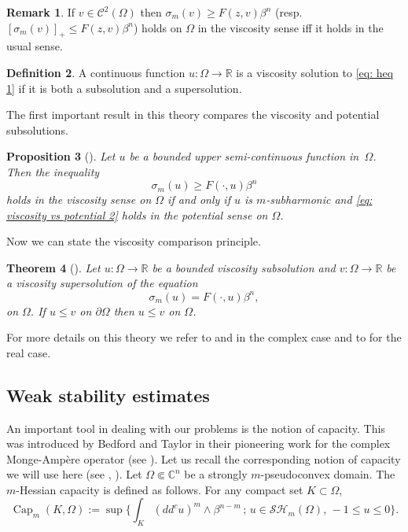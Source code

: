\documentclass[11pt]{article}
\newcommand{\resp}{resp.\xspace}
\providecommand{\C}{}
\numberwithin{equation}{section}
\newcommand{\sep}{\,;\,}
\newtheorem{theorem}{Theorem}[section]
\newtheorem{proposition}[theorem]{Proposition}
\theoremstyle{definition}
\newtheorem{definition}[theorem]{Definition}
\newtheorem{remark}[theorem]{Remark}
\newcommand{\R}{\mathbb{R}}
\renewcommand{\C}{\mathbb{C}}
\newcommand{\Cc}{\mathcal{C}}
\DeclareMathOperator{\Capa}{Cap}
\theoremstyle{plain}
\theoremstyle{definition}
\begin{document}
\begin{remark} If $v \in \Cc^2 (\Omega)$ then $\sigma_m(v)\geq F(z,v)\beta^n$ (\resp $[\sigma_m(v)]_+\leq F(z,v)\beta^n$) holds on $\Omega$ in the viscosity sense iff it holds in the usual sense.
\end{remark}

\begin{definition}
A continuous function $u: \Omega \to \R$ is a viscosity solution to \eqref{eq: heq 1} if it is both a subsolution and a supersolution.
\end{definition}

The first important result in this theory compares the viscosity and potential subsolutions.

\begin{proposition}[\cite{Lu13}] \label{prop: viscosity vs potential general case}
Let $u$ be a bounded upper semi-continuous function in~$\Omega$. Then the inequality
\begin{equation}\label{eq: viscosity vs potential 2}
\sigma_m (u)\geq F(\cdot,u)\beta^n
\end{equation}
holds in the viscosity sense on $\Omega$ if and only if $u$ is $m$-subharmonic and \eqref{eq: viscosity vs potential 2} holds in the potential sense on $\Omega$.
\end{proposition}

Now we can state the viscosity comparison principle.

\begin{theorem} [\cite{Lu13}]\label{thm: viscosity comparison principle}
Let $u: \Omega \to \R$ be a bounded viscosity subsolution and $v: \Omega \to \R$ be a viscosity supersolution of the equation
\[
\sigma_m(u)=F(\cdot,u)\beta^n,
\]
on $\Omega$. If $u \leq v$ on $\partial \Omega$ then $u\leq v$ on $\Omega$.
\end{theorem}

For more details on this theory we refer to \cite{Lu13} and \cite{EGZ11} in the complex case and to \cite{CIL92} for the real case.

\subsection{Weak stability estimates}

An important tool in dealing with our problems is the notion of capacity. This was introduced by Bedford and Taylor in their pioneering work for the complex Monge-Ampère operator (see \cite{BT82}).
Let us recall the corresponding notion of capacity we will use here (see \cite{Lu12}, \cite{SA13}). Let $\Omega \Subset \C^n$ be a strongly $m$-pseudoconvex domain. The $m$-Hessian capacity is defined as follows. For any compact set $K \subset \Omega$,
\[
\Capa_m(K,\Omega):= \sup \bigl\{\textstyle\int_K (dd^c u)^m \wedge \beta^{n - m} \sep u \in \mathcal{SH}_m (\Omega),\, - 1 \leq u \leq 0\bigr\}.
\]
\end{document}
